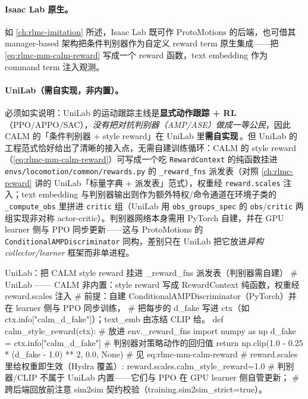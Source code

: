 \paragraph{Isaac Lab 原生。}如 \cref{ch:rlmc-imitation} 所述，Isaac Lab 既可作 ProtoMotions 的后端，也可借其 manager-based 架构把条件判别器作为自定义 reward term 原生集成——把 \cref{eq:rlmc-mm-calm-reward} 写成一个 reward 函数，text embedding 作为 command term 注入观测。

\paragraph{UniLab（需自实现，非内置）。}必须如实说明：UniLab 的运动跟踪主线是\textbf{显式动作跟踪 + RL}（PPO/APPO/SAC），\emph{没有把对抗判别器（AMP/ASE）做成一等公民}，因此 CALM 的「条件判别器 + style reward」在 UniLab 里\textbf{需自实现}\,\cite{unilab2026}。但 UniLab 的工程范式恰好给出了清晰的接入点，无需自建训练循环：CALM 的 style reward（\cref{eq:rlmc-mm-calm-reward}）可写成一个吃 \verb|RewardContext| 的纯函数挂进 \verb|envs/locomotion/common/rewards.py| 的 \verb|_reward_fns| 派发表（对照 \cref{ch:rlmc-reward} 讲的 UniLab「标量字典 + 派发表」范式），权重经 \verb|reward.scales| 注入；text embedding 与判别器输出则作为额外特权/命令通道在环境子类的 \verb|_compute_obs| 里拼进 \verb|critic| 组（UniLab 用 \verb|obs_groups_spec| 的 \verb|obs|/\verb|critic| 两组实现非对称 actor-critic）。判别器网络本身需用 PyTorch 自建，并在 GPU learner 侧与 PPO 同步更新——这与 ProtoMotions 的 \verb|ConditionalAMPDiscriminator| 同构，差别只在 UniLab 把它放进\emph{异构 collector/learner} 框架而非单进程。

\begin{codebox}[Python]{UniLab：把 CALM style reward 挂进 \_reward\_fns 派发表（判别器需自建）}
# UniLab —— CALM 非内置：style reward 写成 RewardContext 纯函数，权重经 reward.scales 注入
# 前提：自建 ConditionalAMPDiscriminator（PyTorch）并在 learner 侧与 PPO 同步训练，
#       把每步的 d_fake 写进 ctx（如 ctx.info["calm_d_fake"]）；text_emb 由冻结 CLIP 给。
def calm_style_reward(ctx):                          # 放进 env._reward_fns
    import numpy as np
    d_fake = ctx.info["calm_d_fake"]                 # 判别器对策略动作的回归值
    return np.clip(1.0 - 0.25 * (d_fake - 1.0) ** 2, 0.0, None)  # 见 eq:rlmc-mm-calm-reward
# reward.scales 里给权重即生效（Hydra 覆盖）: reward.scales.calm_style_reward=1.0
# 判别器/CLIP 不属于 UniLab 内置——它们与 PPO 在 GPU learner 侧自管更新；
# 跨后端回放前注意 sim2sim 契约校验（training.sim2sim_strict=true）。
\end{codebox}

